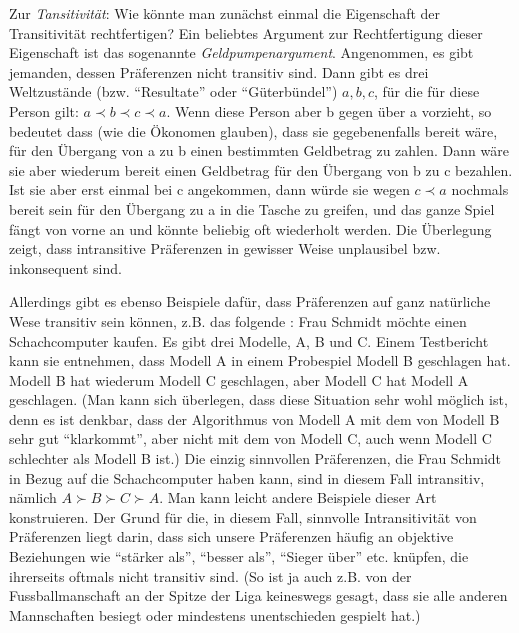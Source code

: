 Zur {\em Tansitivität}: Wie könnte man zunächst einmal die Eigenschaft der
Transitivität rechtfertigen?
\label{Geldpumpenargument} Ein beliebtes
Argument zur Rechtfertigung dieser Eigenschaft ist das sogenannte {\em
Geldpumpenargument}. Angenommen, es gibt jemanden, dessen Präferenzen nicht
transitiv sind. Dann gibt es drei Weltzustände (bzw. "`Resultate"' oder
"`Güterbündel"') $a, b, c$, für die für diese Person gilt: $a \prec b \prec c
\prec a$. Wenn diese Person aber b gegen über a vorzieht, so bedeutet dass (wie
die Ökonomen glauben), dass sie gegebenenfalls bereit wäre, für den Übergang von
a zu b einen bestimmten Geldbetrag zu zahlen. Dann wäre sie aber wiederum bereit
einen Geldbetrag für den Übergang von b zu c bezahlen. Ist sie aber erst einmal
bei c angekommen, dann würde sie wegen $c \prec a$ nochmals bereit sein für den
Übergang zu a in die Tasche zu greifen, und das ganze Spiel fängt von vorne an
und könnte beliebig oft wiederholt werden. Die Überlegung zeigt, dass
intransitive Präferenzen in gewisser Weise unplausibel bzw. inkonsequent sind.

\label{intransitivePraeferenzen}
Allerdings gibt es ebenso Beispiele dafür, dass Präferenzen auf ganz natürliche
Wese transitiv sein können, z.B. das folgende \cite[S. 20]{delong:1991}: Frau
Schmidt möchte einen Schachcomputer kaufen. Es gibt drei Modelle, A, B und C.
Einem Testbericht kann sie entnehmen, dass Modell A in einem Probespiel Modell B
geschlagen hat. Modell B hat wiederum Modell C geschlagen, aber Modell C hat
Modell A geschlagen. (Man kann sich überlegen, dass diese Situation sehr wohl
möglich ist, denn es ist denkbar, dass der Algorithmus von Modell A mit dem von
Modell B sehr gut "`klarkommt"', aber nicht mit dem von Modell C, auch wenn
Modell C schlechter als Modell B ist.) Die einzig sinnvollen Präferenzen, die
Frau Schmidt in Bezug auf die Schachcomputer haben kann, sind in diesem Fall
intransitiv, nämlich $A \succ B \succ C \succ A$. Man kann leicht andere
Beispiele dieser Art konstruieren. Der Grund für die, in diesem Fall, sinnvolle
Intransitivität von Präferenzen liegt darin, dass sich unsere Präferenzen
häufig an objektive Beziehungen wie "`stärker als"', "`besser als"',
"`Sieger über"' etc. knüpfen, die ihrerseits oftmals nicht transitiv sind. (So
ist ja auch z.B. von der Fussballmanschaft an der Spitze der Liga keineswegs
gesagt, dass sie alle anderen Mannschaften besiegt oder mindestens
unentschieden gespielt hat.) 

